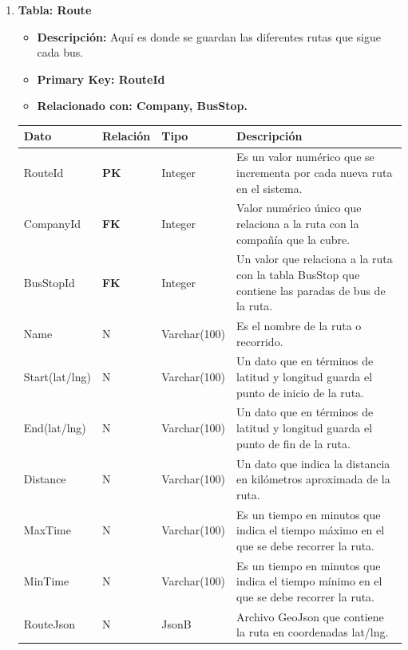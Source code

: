 \documentclass[12pt]{article}
\begin{document}
\begin{enumerate}
    \newpage
    \item \textbf{Tabla: Route}
    \begin{itemize}
        \item \textbf{Descripción:} Aquí es donde se guardan las diferentes rutas que sigue cada bus.
        \item \textbf{Primary Key: RouteId}
        \item \textbf{Relacionado con: Company, BusStop.}
    \end{itemize}
    \begin{table}[!h]
        \centering
        \begin{tabular}{|p{3cm}|p{2cm}|p{2.5cm}|p{8cm}|}
             \hline
             \textbf{Dato} & \textbf{Relación} & \textbf{Tipo} & \textbf{Descripción} \\
             \hline
             RouteId & \textbf{PK} & Integer & Es un valor numérico que se incrementa por cada nueva ruta en el sistema. \\
             \hline
             CompanyId & \textbf{FK} & Integer & Valor numérico único que relaciona a la ruta con la compañía que la cubre.\\
             \hline
             BusStopId & \textbf{FK} & Integer & Un valor que relaciona a la ruta con la tabla BusStop que contiene las paradas de bus de la ruta. \\
             \hline
             Name & N & Varchar(100) & Es el nombre de la ruta o recorrido. \\
             \hline
             Start(lat/lng) & N & Varchar(100) & Un dato que en términos de latitud y longitud guarda el punto de inicio de la ruta. \\
             \hline
             End(lat/lng) & N & Varchar(100) & Un dato que en términos de latitud y longitud guarda el punto de fin de la ruta. \\
             \hline
             Distance & N & Varchar(100) & Un dato que indica la distancia en kilómetros aproximada de la ruta. \\
             \hline
             MaxTime & N & Varchar(100) & Es un tiempo en minutos que indica el tiempo máximo en el que se debe recorrer la ruta. \\
             \hline
             MinTime & N & Varchar(100) & Es un tiempo en minutos que indica el tiempo mínimo en el que se debe recorrer la ruta. \\
             \hline
             RouteJson & N & JsonB & Archivo GeoJson que contiene la ruta en coordenadas lat/lng.\\
             \hline
        \end{tabular}
    \end{table}
    

\end{enumerate}
\end{document}

